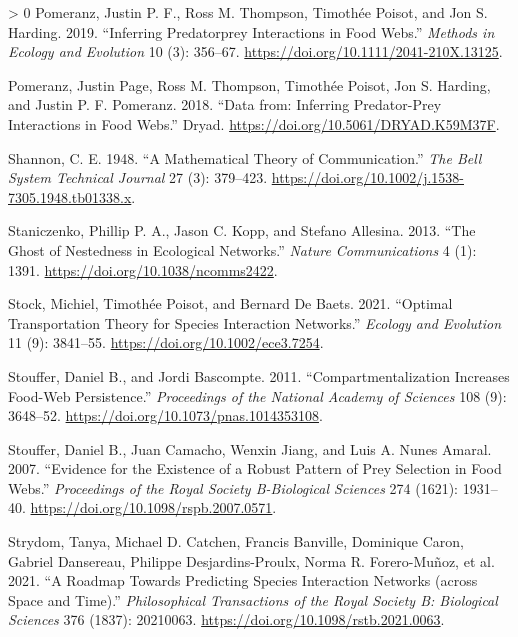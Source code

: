 \documentclass[10pt,oneside]{article}
\newlength{\cslhangindent}
\newenvironment{CSLReferences}[3] %
 {%
  \setlength{\parindent}{0pt}
  \ifodd #1 \everypar{\setlength{\hangindent}{\cslhangindent}}\ignorespaces\fi
  \ifnum #2 > 0
  \setlength{\parskip}{#2\baselineskip}
  \fi
 }%
 {}
\begin{document}
\begin{CSLReferences}{1}{0}
\leavevmode\hypertarget{ref-Pomeranz2019InfPrea}{}%
Pomeranz, Justin P. F., Ross M. Thompson, Timothée Poisot, and Jon S.
Harding. 2019. {``Inferring Predatorprey Interactions in Food Webs.''}
\emph{Methods in Ecology and Evolution} 10 (3): 356--67.
\url{https://doi.org/10.1111/2041-210X.13125}.

\leavevmode\hypertarget{ref-Pomeranz2018DatInf}{}%
Pomeranz, Justin Page, Ross M. Thompson, Timothée Poisot, Jon S.
Harding, and Justin P. F. Pomeranz. 2018. {``Data from: Inferring
Predator-Prey Interactions in Food Webs.''} Dryad.
\url{https://doi.org/10.5061/DRYAD.K59M37F}.

\leavevmode\hypertarget{ref-Shannon1948MatThe}{}%
Shannon, C. E. 1948. {``A Mathematical Theory of Communication.''}
\emph{The Bell System Technical Journal} 27 (3): 379--423.
\url{https://doi.org/10.1002/j.1538-7305.1948.tb01338.x}.

\leavevmode\hypertarget{ref-Staniczenko2013GhoNes}{}%
Staniczenko, Phillip P. A., Jason C. Kopp, and Stefano Allesina. 2013.
{``The Ghost of Nestedness in Ecological Networks.''} \emph{Nature
Communications} 4 (1): 1391. \url{https://doi.org/10.1038/ncomms2422}.

\leavevmode\hypertarget{ref-Stock2021OptTra}{}%
Stock, Michiel, Timothée Poisot, and Bernard De Baets. 2021. {``Optimal
Transportation Theory for Species Interaction Networks.''} \emph{Ecology
and Evolution} 11 (9): 3841--55.
\url{https://doi.org/10.1002/ece3.7254}.

\leavevmode\hypertarget{ref-Stouffer2011ComInc}{}%
Stouffer, Daniel B., and Jordi Bascompte. 2011. {``Compartmentalization
Increases Food-Web Persistence.''} \emph{Proceedings of the National
Academy of Sciences} 108 (9): 3648--52.
\url{https://doi.org/10.1073/pnas.1014353108}.

\leavevmode\hypertarget{ref-Stouffer2007EviExi}{}%
Stouffer, Daniel B., Juan Camacho, Wenxin Jiang, and Luis A. Nunes
Amaral. 2007. {``Evidence for the Existence of a Robust Pattern of Prey
Selection in Food Webs.''} \emph{Proceedings of the Royal Society
B-Biological Sciences} 274 (1621): 1931--40.
\url{https://doi.org/10.1098/rspb.2007.0571}.

\leavevmode\hypertarget{ref-Strydom2021RoaPre}{}%
Strydom, Tanya, Michael D. Catchen, Francis Banville, Dominique Caron,
Gabriel Dansereau, Philippe Desjardins-Proulx, Norma R. Forero-Muñoz, et
al. 2021. {``A Roadmap Towards Predicting Species Interaction Networks
(across Space and Time).''} \emph{Philosophical Transactions of the
Royal Society B: Biological Sciences} 376 (1837): 20210063.
\url{https://doi.org/10.1098/rstb.2021.0063}.


\end{CSLReferences}
\end{document}
